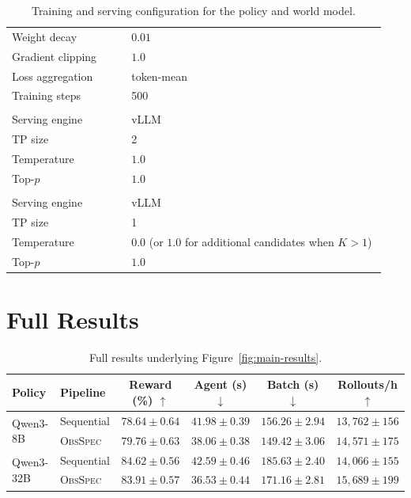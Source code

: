 \documentclass{article} %
\newcommand{\method}{\textsc{ObsSpec}}
\begin{document}
\begin{table}[H]
\begin{tabular}{@{}p{0.30\linewidth}p{0.64\linewidth}@{}}
        Weight decay & $0.01$ \\
        Gradient clipping & $1.0$ \\
        Loss aggregation & token-mean \\
        Training steps & 500 \\
        \addlinespace
        \multicolumn{2}{@{}l}{\textit{Policy serving}} \\
        Serving engine & vLLM \\
        TP size & 2 \\
        Temperature & $1.0$ \\
        Top-$p$ & $1.0$ \\
        \addlinespace
        \multicolumn{2}{@{}l}{\textit{World model serving}} \\
        Serving engine & vLLM \\
        TP size & 1 \\
        Temperature & $0.0$ (or $1.0$ for additional candidates when $K>1$) \\
        Top-$p$ & $1.0$ \\
        \bottomrule
    \end{tabular}
    \caption{Training and serving configuration for the policy and world model.}
    \label{tab:training-configuration}
\end{table}

\clearpage
\section{Full Results}
\label{sec:full-results}

\begin{table}[!ht]
    \centering
    \small
    \setlength{\tabcolsep}{4pt}
    \begin{tabular}{llcccc}
        \toprule
        Policy & Pipeline & Reward (\%) $\uparrow$ & Agent (s) $\downarrow$ & Batch (s) $\downarrow$ & Rollouts/h $\uparrow$ \\
        \midrule
        \multirow{2}{*}{Qwen3-8B}
            & Sequential & $78.64 \pm 0.64$ & $41.98 \pm 0.39$ & $156.26 \pm 2.94$ & $13{,}762 \pm 156$ \\
            & \method    & $79.76 \pm 0.63$ & $38.06 \pm 0.38$ & $149.42 \pm 3.06$ & $14{,}571 \pm 175$ \\
        \midrule
        \multirow{2}{*}{Qwen3-32B}
            & Sequential & $84.62 \pm 0.56$ & $42.59 \pm 0.46$ & $185.63 \pm 2.40$ & $14{,}066 \pm 155$ \\
            & \method    & $83.91 \pm 0.57$ & $36.53 \pm 0.44$ & $171.16 \pm 2.81$ & $15{,}689 \pm 199$ \\
        \bottomrule
    \end{tabular}
    \caption{Full results underlying Figure~\ref{fig:main-results}.}
    \label{tab:main-results}
\end{table}
\end{document}
